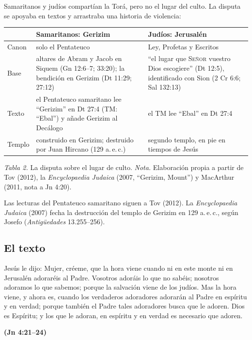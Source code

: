 \documentclass[11pt,letterpaper]{article}
\newcommand{\SENOR}{\textsc{Señor}}
\newcommand{\fuente}[1]{\par\hfill{\upshape\bfseries\small\textcolor{azul}{#1}}}
\begin{document}
Samaritanos y judíos compartían la Torá, pero no el lugar del culto. La disputa se apoyaba en textos y arrastraba una historia de violencia:

\begin{center}\small\renewcommand{\arraystretch}{1.22}
\begin{tabular}{@{}L{2.2cm}L{6.0cm}L{6.0cm}@{}}
\toprule
 & \textbf{Samaritanos: Gerizim} & \textbf{Judíos: Jerusalén} \\ \midrule
Canon & solo el Pentateuco & Ley, Profetas y Escritos \\
Base & altares de Abram y Jacob en Siquem (Gn 12:6--7; 33:20); la bendición en Gerizim (Dt 11:29; 27:12) & ``el lugar que \SENOR{} vuestro Dios escogiere'' (Dt 12:5), identificado con Sion (2 Cr 6:6; Sal 132:13) \\
Texto & el Pentateuco samaritano lee ``Gerizim'' en Dt 27:4 (TM: ``Ebal'') y añade Gerizim al Decálogo & el TM lee ``Ebal'' en Dt 27:4 \\
Templo & construido en Gerizim; destruido por Juan Hircano (129 a.\,e.\,c.) & segundo templo, en pie en tiempos de Jesús \\
\bottomrule
\end{tabular}\par
{\footnotesize\color{gris}\textit{Tabla 2.} La disputa sobre el lugar de culto. \textit{Nota.} Elaboración propia a partir de Tov (2012), la \emph{Encyclopaedia Judaica} (2007, ``Gerizim, Mount'') y MacArthur (2011, nota a Jn 4:20).}
\end{center}

\begin{nota}
Las lecturas del Pentateuco samaritano siguen a Tov (2012). La \emph{Encyclopaedia Judaica} (2007) fecha la destrucción del templo de Gerizim en 129 a.\,e.\,c., según Josefo (\emph{Antigüedades} 13.255--256).
\end{nota}

\subsection{El texto}

\begin{cita}Jesús le dijo: Mujer, créeme, que la hora viene cuando ni en este monte ni en Jerusalén adoraréis al Padre. Vosotros adoráis lo que no sabéis; nosotros adoramos lo que sabemos; porque la salvación viene de los judíos. Mas la hora viene, y ahora es, cuando los verdaderos adoradores adorarán al Padre en espíritu y en verdad; porque también el Padre tales adoradores busca que le adoren. Dios es Espíritu; y los que le adoran, en espíritu y en verdad es necesario que adoren.\fuente{(Jn 4:21--24)}\end{cita}
\end{document}
